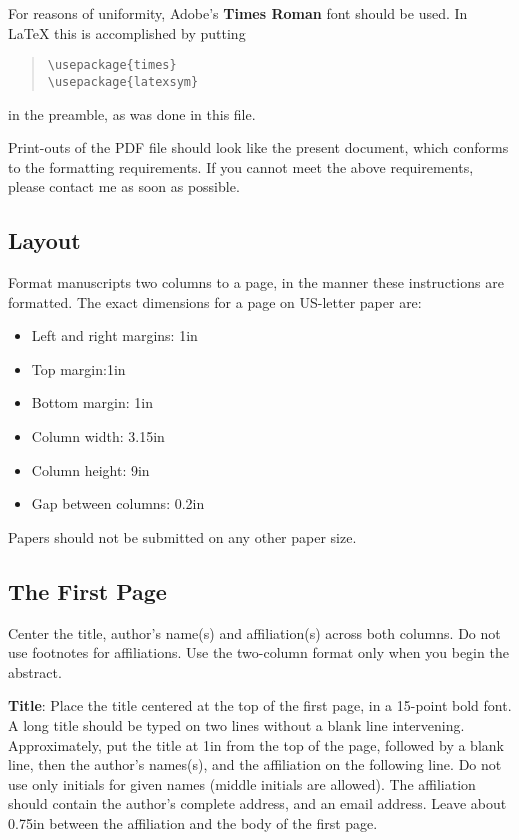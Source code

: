 \documentclass[11pt]{article}
\begin{document}
For reasons of uniformity, Adobe's {\bf Times Roman} font should be
used. In \LaTeX{} this is accomplished by putting

\begin{quote}
\begin{verbatim}
\usepackage{times}
\usepackage{latexsym}
\end{verbatim}
\end{quote}
in the preamble, as was done in this file.

Print-outs of the PDF file should look like the present document,
which conforms to the formatting requirements. If you cannot meet the
above requirements, please contact me as soon as possible.

\subsection{Layout}
\label{ssec:layout}

Format manuscripts two columns to a page, in the manner these
instructions are formatted. The exact dimensions for a page on US-letter
paper are:

\begin{itemize}
\item Left and right margins: 1in
\item Top margin:1in
\item Bottom margin: 1in
\item Column width: 3.15in
\item Column height: 9in
\item Gap between columns: 0.2in
\end{itemize}

Papers should not be submitted on any other paper size. 

\subsection{The First Page}
\label{ssec:first}

Center the title, author's name(s) and affiliation(s) across both
columns. Do not use footnotes for affiliations.  Use the two-column
format only when you begin the abstract.

{\bf Title}: Place the title centered at the top of the first page, in
a 15-point bold font. A long title should be typed on two lines
without a blank line intervening. Approximately, put the title at 1in
from the top of the page, followed by a blank line, then the author's
names(s), and the affiliation on the following line.  Do not use only
initials for given names (middle initials are allowed). The
affiliation should contain the author's complete address, and an email
address. Leave about 0.75in between the affiliation and the body of
the first page.
\end{document}
